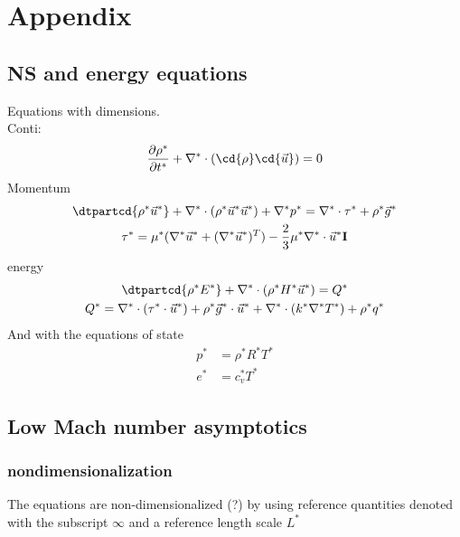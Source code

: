 \chapter{Appendix}	\label{ch:appendix}
\glsresetall
	\section{NS and energy equations}
	Equations with dimensions.\\
	Conti:
	\begin{equation}
	\frac{\partial \rho^*}{\partial t^*}+ \nabla ^* \cdot (\cd{\rho}\cd{\vec{u}}) = 0
	\end{equation}
	Momentum
	\begin{gather}
	\dtpartcd{\rho^*\vec{u}^* } + \nabla ^* \cdot (\rho^*\vec{u}^*\vec{u}^*) + \nabla^*p^* = \nabla^* \cdot \tau^* + \rho^* \vec{g}^*\\
	\tau^* = \mu^*(\nabla^*\vec{u}^* + (\nabla^*\vec{u}^*)^T) - \frac{2}{3}\mu^*\nabla^*\cdot \vec{u}^*\mathbf{I}
	\end{gather}
	energy
	\begin{gather}
	\dtpartcd{\rho^*E^* } + \nabla ^* \cdot (\rho^*H^*\vec{u}^*) = Q^*\\
	Q^* = \nabla^* \cdot (\tau^*\cdot\vec{u}^*) + \rho^* \vec{g}^* \cdot \vec{u}^* + \nabla^*\cdot (k^*\nabla^*T^*)+\rho^*q^*
	\end{gather}
	And with the equations of state 
	\begin{align}
	p^* &= \rho ^* R^* T^*\\
	e^* &= c_v^*T^*
	\end{align}
	\section{Low Mach number asymptotics}
	\subsection{nondimensionalization}
	The equations are non-dimensionalized (?) by using reference quantities denoted with the subscript $\infty$ and a reference length scale $L^*$
	
